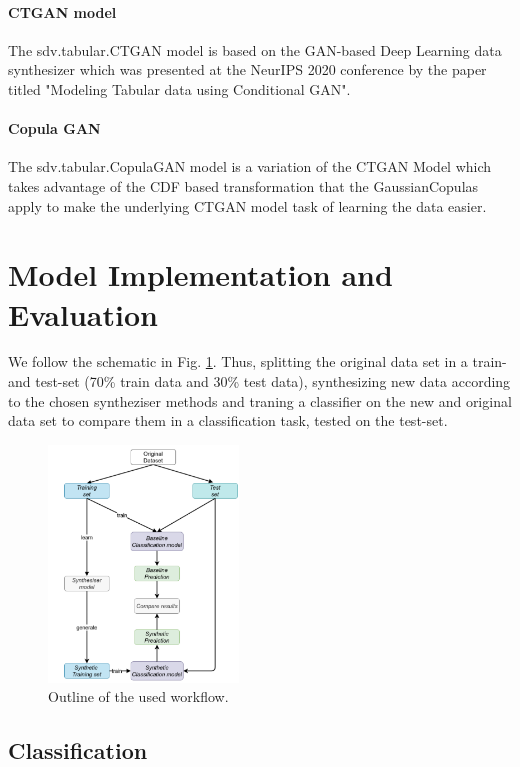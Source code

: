 \documentclass{article}
\begin{document}
\paragraph{CTGAN model}
The sdv.tabular.CTGAN model \cite{ctgan} is based on the GAN-based Deep Learning data synthesizer which was presented at the NeurIPS 2020 conference by the paper titled "Modeling Tabular data using Conditional GAN".
\paragraph{Copula GAN}
The sdv.tabular.CopulaGAN model \cite{copulagan} is a variation of the CTGAN Model which takes advantage of the CDF based transformation that the GaussianCopulas apply to make the underlying CTGAN model task of learning the data easier.



\section{Model Implementation and Evaluation}

We follow the schematic in Fig. \ref{fig:schematic}. Thus, splitting the original data set in a train- and test-set (70\% train data and 30\% test data), synthesizing new data according to the chosen syntheziser methods and traning a classifier on the new and original data set to compare them in a classification task, tested on the test-set.

\begin{figure}[h!]
	\centering
	\includegraphics[width=0.45\textwidth]{pics/schematic.png}

	\caption{Outline of the used workflow.}
	\label{fig:schematic}
\end{figure}


\subsection{Classification}
\end{document}

